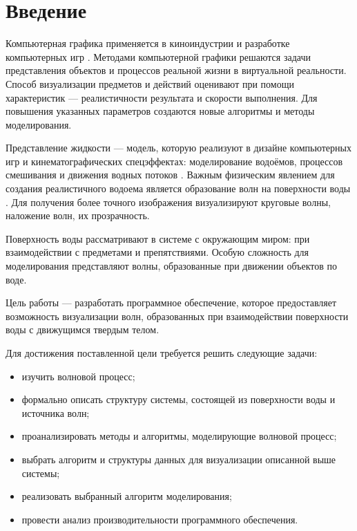 \chapter*{Введение}

Компьютерная графика применяется в киноиндустрии и разработке компьютерных игр \cite{large}. Методами компьютерной графики решаются задачи представления объектов и процессов реальной жизни в виртуальной реальности. Способ визуализации предметов и действий оценивают при помощи характеристик --- реалистичности результата и скорости выполнения. Для повышения указанных параметров создаются новые алгоритмы и методы моделирования.

Представление жидкости --- модель, которую реализуют в дизайне компьютерных игр и кинематографических спецэффектах: моделирование водоёмов, процессов смешивания и движения водных потоков \cite{packets}. Важным физическим явлением для создания реалистичного водоема является образование волн на поверхности воды \cite{dispersion}. Для получения более точного изображения визуализируют круговые волны, наложение волн, их прозрачность.

Поверхность воды рассматривают в системе с окружающим миром: при взаимодействии с предметами и препятствиями. Особую сложность для моделирования представляют волны, образованные при движении объектов по воде.

Цель работы --- разработать программное обеспечение, которое предоставляет возможность визуализации волн, образованных при взаимодействии поверхности воды с движущимся твердым телом.

Для достижения поставленной цели требуется решить следующие задачи:

\begin{itemize}
	\item изучить волновой процесс;
	\item формально описать структуру системы, состоящей из поверхности воды и источника волн;
	\item проанализировать методы и алгоритмы, моделирующие волновой процесс;
	\item выбрать алгоритм и структуры данных для визуализации описанной выше системы;
	\item реализовать выбранный алгоритм моделирования;
	\item провести анализ производительности программного обеспечения.
\end{itemize}
